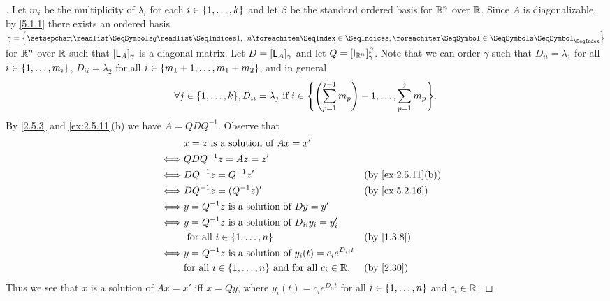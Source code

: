 \begin{proof}[]
  Let \(m_i\) be the multiplicity of \(\lambda_i\) for each \(i \in \left\lbrace1, \dots, k\right\rbrace\) and let \(\beta\) be the standard ordered basis for \(\mathbb{R}^n\) over \(\mathbb{R}\).
  Since \(A\) is diagonalizable, by \cref{5.1.1} there exists an ordered basis \(\gamma = \set{\seq{q}{1,,n}}\) for \(\mathbb{R}^n\) over \(\mathbb{R}\) such that \([\mathsf{L}_A]_{\gamma}\) is a diagonal matrix.
  Let \(D = [\mathsf{L}_A]_{\gamma}\) and let \(Q = [\IT[\R^n]]_{\gamma}^{\beta}\).
  Note that we can order \(\gamma\) such that \(D_{i i} = \lambda_1\) for all \(i \in \left\lbrace1, \dots, m_i\right\rbrace\), \(D_{i i} = \lambda_2\) for all \(i \in \left\lbrace m_1 + 1, \dots, m_1 + m_2\right\rbrace\), and in general
  \[
    \forall j \in \set{1, \dots, k}, D_{i i} = \lambda_j \text{ if } i \in \set{\pa{\sum_{p = 1}^{j - 1} m_p} - 1, \dots, \sum_{p = 1}^j m_p}.
  \]
  By \cref{2.5.3} and \cref{ex:2.5.11}(b) we have \(A = Q D Q^{-1}\).
  Observe that
  \begin{align*}
         & x = z \text{ is a solution of } Ax = x'                                                                       \\
    \iff & Q D Q^{-1} z = Az = z'                                                                                        \\
    \iff & D Q^{-1} z = Q^{-1} z'                                                   &  & \text{(by \cref{ex:2.5.11}(b))} \\
    \iff & D Q^{-1} z = (Q^{-1} z)'                                                 &  & \text{(by \cref{ex:5.2.16})}    \\
    \iff & y = Q^{-1} z \text{ is a solution of } D y = y'                                                               \\
    \iff & y = Q^{-1} z \text{ is a solution of } D_{i i} y_i = y_i'                                                     \\
         & \text{ for all } i \in \set{1, \dots, n}                                 &  & \text{(by \cref{1.3.8})}        \\
    \iff & y = Q^{-1} z \text{ is a solution of } y_i(t) = c_i e^{D_{i i} t}                                             \\
         & \text{for all } i \in \set{1, \dots, n} \text{ and for all } c_i \in \R. &  & \text{(by \cref{2.30})}
  \end{align*}
  Thus we see that \(x\) is a solution of \(Ax = x'\) iff \(x = Qy\), where \(y_i(t) = c_i e^{D_{i i} t}\) for all \(i \in \left\lbrace1, \dots, n\right\rbrace\) and \(c_i \in \mathbb{R}\).


\end{proof}
